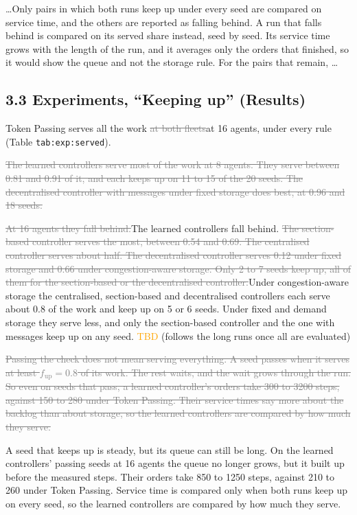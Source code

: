 \documentclass[11pt,a4paper]{article}
\newcommand{\new}[1]{\textcolor{newc}{#1}}
\newcommand{\old}[1]{\textcolor{gray}{\sout{#1}}}
\newcommand{\tbd}{\textcolor{orange}{TBD}}
\begin{document}
\dots Only pairs in which both runs keep up under every seed are compared
on service time, and the others are reported as falling behind.
\new{A run that falls behind is compared on its served share instead, seed
by seed. Its service time grows with the length of the run, and it averages
only the orders that finished, so it would show the queue and not the
storage rule.} For the pairs that remain, \dots

\subsection*{3.3 Experiments, ``Keeping up'' (Results)}

Token Passing serves all the work \old{at both fleets}\new{at 16 agents},
under every rule (Table \texttt{tab:exp:served}).

\old{The learned controllers serve most of the work at 8 agents. They serve
between 0.81 and 0.91 of it, and each keeps up on 11 to 15 of the 20 seeds.
The decentralised controller with messages under fixed storage does best,
at 0.96 and 18 seeds.}

\old{At 16 agents they fall behind.}\new{The learned controllers fall
behind.} \old{The section-based controller serves the
most, between 0.54 and 0.69. The centralised controller serves about half.
The decentralised controller serves 0.12 under fixed storage and 0.66 under
congestion-aware storage. Only 2 to 7 seeds keep up, all of them for the
section-based or the decentralised controller.}\new{Under congestion-aware
storage the centralised, section-based and decentralised controllers each
serve about 0.8 of the work and keep up on 5 or 6 seeds. Under fixed and
demand storage they serve less, and only the section-based controller and
the one with messages keep up on any seed.} \tbd{} (follows the long runs
once all are evaluated)

\old{Passing the check does not mean serving everything. A seed passes when
it serves at least $f_{\mathrm{up}} = 0.8$ of its work. The rest waits, and
the wait grows through the run. So even on seeds that pass, a learned
controller's orders take 300 to 3200 steps, against 150 to 280 under Token
Passing. Their service times say more about the backlog than about storage,
so the learned controllers are compared by how much they serve.}

\new{A seed that keeps up is steady, but its queue can still be long. On
the learned controllers' passing seeds at 16 agents the queue no longer
grows, but it built up before the measured steps. Their orders take 850 to
1250 steps, against 210 to 260 under Token Passing. Service time is compared
only when both runs keep up on every seed, so the learned controllers are
compared by how much they serve.}
\end{document}
